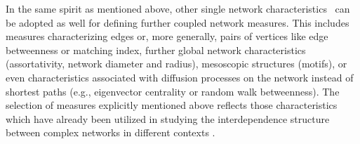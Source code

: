 		In the same spirit as mentioned above, other single network characteristics~\cite{Boccaletti2006,Costa2007} can be adopted as well for defining further coupled network measures. This includes measures characterizing edges or, more generally, pairs of vertices like edge betweenness or matching index, further global network characteristics (assortativity, network diameter and radius), mesoscopic structures (motifs), or even characteristics associated with diffusion processes on the network instead of shortest paths (e.g., eigenvector centrality or random walk betweenness). The selection of measures explicitly mentioned above reflects those characteristics which have already been utilized in studying the interdependence structure between complex networks in different contexts \cite{Donges2011b,Wiedermann2013}. 
			
